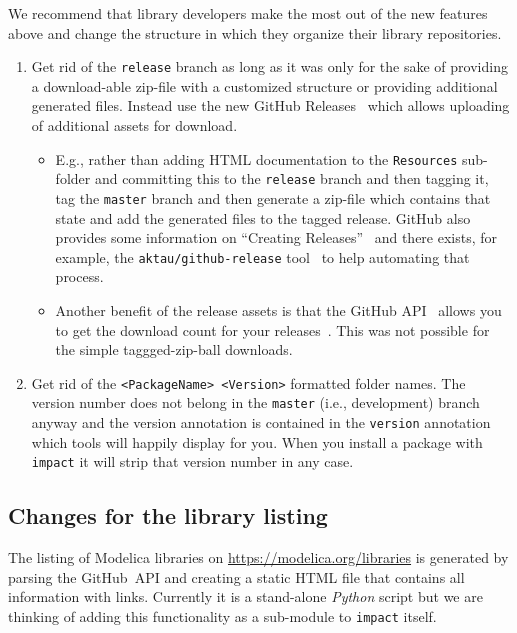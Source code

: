 \documentclass[11pt,a4paper,twocolumn]{article}
\newcommand{\code}[1]{\texttt{#1}} %
\begin{document}
We recommend that library developers make the most out of the new
features above and change the structure in which they organize their
library repositories.
\begin{enumerate}
\item Get rid of the \texttt{release} branch as long as it was only
  for the sake of providing a download-able zip-file with a customized
  structure or providing additional generated files.
  Instead use the new GitHub Releases~\parencite{gh-assets} which
  allows uploading of additional assets for download.
  \begin{itemize}
  \item E.g., rather than adding HTML documentation to the
    \texttt{Resources} sub-folder and committing this to the
    \texttt{release} branch and then tagging it, tag the
    \texttt{master} branch and then generate a zip-file which contains
    that state and add the generated files to the tagged release.
    GitHub also provides some information on ``Creating
    Releases''~\parencite{gh-releases} and there exists, for example,
    the \texttt{aktau/github-release}
    tool~\parencite{aktau-github-release} to help automating that
    process.
  \item Another benefit of the release assets is that the GitHub
    API~\parencite{gh-api} allows you to get the download count for
    your releases~\parencite{gh-dl-count}.  This was not possible for
    the simple taggged-zip-ball downloads.
  \end{itemize}
\item Get rid of the \texttt{<PackageName> <Version>} formatted folder
  names. The version number does not belong in the \texttt{master}
  (i.e., development) branch anyway and the version annotation is
  contained in the \texttt{version} annotation which tools will
  happily display for you. When you install a package with
  \code{impact} it will strip that version number in any case.
\end{enumerate}

\subsection{Changes for the library listing}
The listing of Modelica libraries on
\url{https://modelica.org/libraries} is generated by parsing the
GitHub~API and creating a static HTML file that contains all
information with links. Currently it is a stand-alone \emph{Python}
script but we are thinking of adding this functionality as a
sub-module to \code{impact} itself.
\end{document}
